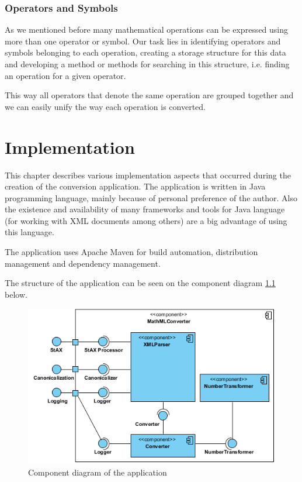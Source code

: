 \documentclass[11pt,oneside,final]{fithesis2}
\begin{document}
\subsection{Operators and Symbols}
As we mentioned before many mathematical operations can be expressed using more than one operator or symbol. Our task lies in identifying operators and symbols belonging to each operation, creating a storage structure for this data and developing a method or methods for searching in this structure, i.e. finding an operation for a given operator. 

This way all operators that denote the same operation are grouped together and we can easily unify the way each operation is converted.


\chapter{Implementation}
This chapter describes various implementation aspects that occurred during the creation of the conversion application. The application is written in Java programming language, mainly because of personal preference of the author. Also the existence and availability of many frameworks and tools for Java language (for working with XML documents among others) are a big advantage of using this language. 

The application uses Apache Maven for build automation, distribution management and dependency management.

The structure of the application can be seen on the component diagram \ref{fig:componentdiagram} below.

\begin{figure}[!ht]
\centering
\includegraphics[width=\textwidth]{component_diagram}
\caption{Component diagram of the application}
\label{fig:componentdiagram}
\end{figure}
\end{document}
